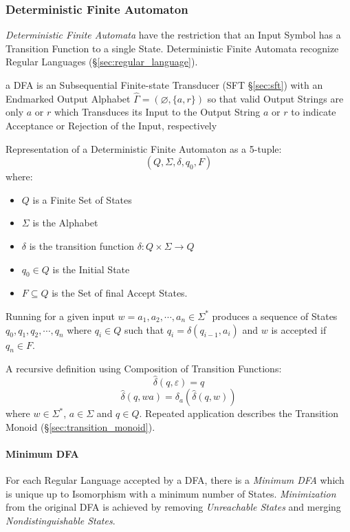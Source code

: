\subsubsection{Deterministic Finite Automaton}\label{sec:dfa}

\emph{Deterministic Finite Automata} have the restriction that an
Input Symbol has a Transition Function to a single State.
Deterministic Finite Automata recognize Regular Languages
(\S\ref{sec:regular_language}).

a DFA is an Subsequential Finite-state Transducer (SFT \S\ref{sec:sft}) with an
Endmarked Output Alphabet $\hat{\Gamma} = (\varnothing, \{a,r\})$ so that valid
Output Strings are only $a$ or $r$ which Transduces its Input to the Output
String $a$ or $r$ to indicate Acceptance or Rejection of the Input, respectively

Representation of a Deterministic Finite Automaton as a 5-tuple:
\[
  (Q,\Sigma,\delta,q_0,F)
\]
where:
\begin{itemize}
  \item $Q$ is a Finite Set of States
  \item $\Sigma$ is the Alphabet
  \item $\delta$ is the transition function $\delta: Q \times
    \Sigma \rightarrow Q$
  \item $q_0 \in Q$ is the Initial State
  \item $F \subseteq Q$ is the Set of final Accept States.
\end{itemize}

Running for a given input $w = a_1,a_2, \cdots , a_n \in \Sigma^*$
produces a sequence of States $q_0,q_1,q_2,\cdots , q_n$ where $q_i
\in Q$ such that $q_i = \delta (q_{i-1},a_i)$ and $w$ is accepted if
$q_n \in F$.

A recursive definition using Composition of Transition Functions:
\[
  \widehat{\delta}(q,\varepsilon) = q
\]\[
  \widehat{\delta}(q,wa) = \delta_a(\widehat{\delta}(q,w))
\]
where $w \in \Sigma^*$, $a \in \Sigma$ and $q \in Q$. Repeated
application describes the Transition Monoid
(\S\ref{sec:transition_monoid}).



\paragraph{Minimum DFA}\label{sec:minimum_dfa}\hfill

For each Regular Language accepted by a DFA, there is a \emph{Minimum
  DFA} which is unique up to Isomorphism with a minimum number of
States. \emph{Minimization} from the original DFA is achieved by
removing \emph{Unreachable States} and merging
\emph{Nondistinguishable States}.




